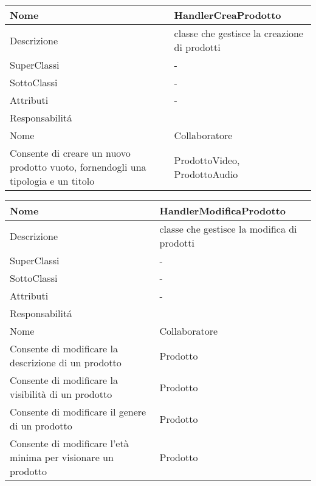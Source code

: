 \begin{center} 
    \begin{longtable}{ |p{3cm}|p{3cm}|p{3cm}|p{3cm}| }
        \hline
        Nome & \multicolumn{3}{|p{9cm}|}{HandlerCreaProdotto} \\\hline
        Descrizione & \multicolumn{3}{|p{9cm}|}{classe che gestisce la creazione di prodotti} \\\hline
        SuperClassi & \multicolumn{3}{|p{9cm}|}{-} \\\hline
        SottoClassi & \multicolumn{3}{|p{9cm}|}{-} \\\hline
        Attributi & \multicolumn{3}{|p{9cm}|}{-} \\\hline
        \multicolumn{4}{|p{12cm}|}{Responsabilit\'a} \\\hline %
        \multicolumn{2}{|p{6cm}|}{Nome} & \multicolumn{2}{|p{6cm}|}{Collaboratore} \\\hline
        \multicolumn{2}{|p{6cm}|}{Consente di creare un nuovo prodotto vuoto, fornendogli una tipologia e un titolo} & \multicolumn{2}{|p{6cm}|}{ProdottoVideo, ProdottoAudio} \\\hline
    \end{longtable}
\end{center}


\begin{center} 
    \begin{longtable}{ |p{3cm}|p{3cm}|p{3cm}|p{3cm}| }
        \hline
        Nome & \multicolumn{3}{|p{9cm}|}{HandlerModificaProdotto} \\\hline
        Descrizione & \multicolumn{3}{|p{9cm}|}{classe che gestisce la modifica di prodotti} \\\hline
        SuperClassi & \multicolumn{3}{|p{9cm}|}{-} \\\hline
        SottoClassi & \multicolumn{3}{|p{9cm}|}{-} \\\hline
        Attributi & \multicolumn{3}{|p{9cm}|}{-} \\\hline
        \multicolumn{4}{|p{12cm}|}{Responsabilit\'a} \\\hline %
        \multicolumn{2}{|p{6cm}|}{Nome} & \multicolumn{2}{|p{6cm}|}{Collaboratore} \\\hline
        \multicolumn{2}{|p{6cm}|}{Consente di modificare la descrizione di un prodotto} & \multicolumn{2}{|p{6cm}|}{Prodotto} \\\hline
        \multicolumn{2}{|p{6cm}|}{Consente di modificare la visibilità di un prodotto} & \multicolumn{2}{|p{6cm}|}{Prodotto} \\\hline
        \multicolumn{2}{|p{6cm}|}{Consente di modificare il genere di un prodotto} & \multicolumn{2}{|p{6cm}|}{Prodotto} \\\hline
        \multicolumn{2}{|p{6cm}|}{Consente di modificare l'età minima per visionare un prodotto} & \multicolumn{2}{|p{6cm}|}{Prodotto} \\\hline
    \end{longtable}
\end{center}

